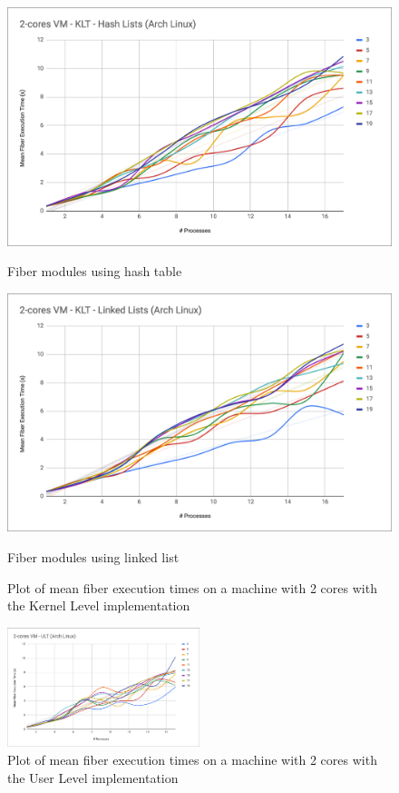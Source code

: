 \documentclass[a4paper,10pt]{article}
\begin{document}
  \begin{figure}[htb!]
    \centering
    \begin{minipage}{0.45\textwidth}%
      \centering
      \includegraphics[width=\textwidth]{imgs/bench-2cores-hash}
      \caption{Fiber modules using hash table}
      \label{fig:bench-2cores-hash}
    \end{minipage}%
    \qquad
    \begin{minipage}{0.45\textwidth}%
      \centering
      \includegraphics[width=\textwidth]{imgs/bench-2cores-linked}
      \caption{Fiber modules using linked list}
      \label{fig:bench-2cores-linked}%
    \end{minipage}%
    \caption{Plot of mean fiber execution times on a machine with 2 cores with the Kernel Level implementation}
  \end{figure}

  \begin{figure}[htb!]
    \centering
    \includegraphics[width=0.5\textwidth]{imgs/bench-2cores-ult}
    \caption{Plot of mean fiber execution times on a machine with 2 cores with the User Level implementation}
    \label{fig:bench-2cores-ult}
  \end{figure}
\end{document}
